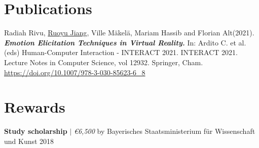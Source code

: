 \documentclass[letterpaper,11pt]{article}
\begin{document}
  \section{Publications}
  Radiah Rivu, \underline{Ruoyu Jiang}, Ville Mäkelä, Mariam Hassib and Florian Alt(2021). \textbf{\textit{Emotion Elicitation Techniques in Virtual Reality.}} In: Ardito C. et al. (eds) Human-Computer Interaction - INTERACT 2021. INTERACT 2021. Lecture Notes in Computer Science, vol 12932. Springer, Cham. \url{https://doi.org/10.1007/978-3-030-85623-6_8} 

 \section{Rewards}
 {\textbf{Study scholarship} $|$ \emph{\euro 6,500} by Bayerisches Staatsministerium für Wissenschaft und Kunst }{2018}

\end{document}
